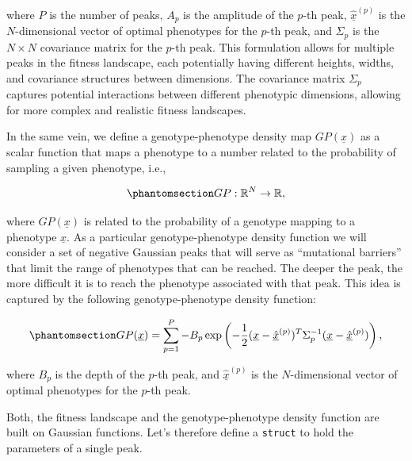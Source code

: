 \documentclass[
]{scrartcl}
\begin{document}
where \(P\) is the number of peaks, \(A_p\) is the amplitude of the
\(p\)-th peak, \(\underline{\hat{x}}^{(p)}\) is the \(N\)-dimensional
vector of optimal phenotypes for the \(p\)-th peak, and \(\Sigma_p\) is
the \(N \times N\) covariance matrix for the \(p\)-th peak. This
formulation allows for multiple peaks in the fitness landscape, each
potentially having different heights, widths, and covariance structures
between dimensions. The covariance matrix \(\Sigma_p\) captures
potential interactions between different phenotypic dimensions, allowing
for more complex and realistic fitness landscapes.

In the same vein, we define a genotype-phenotype density map
\(GP(\underline{x})\) as a scalar function that maps a phenotype to a
number related to the probability of sampling a given phenotype, i.e.,

\begin{equation}\phantomsection\label{eq-genotype-phenotype-density}{
GP: \mathbb{R}^N \to \mathbb{R},
}\end{equation}

where \(GP(\underline{x})\) is related to the probability of a genotype
mapping to a phenotype \(\underline{x}\). As a particular
genotype-phenotype density function we will consider a set of negative
Gaussian peaks that will serve as ``mutational barriers'' that limit the
range of phenotypes that can be reached. The deeper the peak, the more
difficult it is to reach the phenotype associated with that peak. This
idea is captured by the following genotype-phenotype density function:

\begin{equation}\phantomsection\label{eq-genotype-phenotype-density-gaussian}{
GP(\underline{x}) = 
\sum_{p=1}^P -B_p 
\exp\left(
    -\frac{1}{2}(\underline{x} - \underline{\hat{x}}^{(p)})^T 
    \Sigma_p^{-1} 
    (\underline{x} - \underline{\hat{x}}^{(p)})
\right),
}\end{equation}

where \(B_p\) is the depth of the \(p\)-th peak, and
\(\underline{\hat{x}}^{(p)}\) is the \(N\)-dimensional vector of optimal
phenotypes for the \(p\)-th peak.

Both, the fitness landscape and the genotype-phenotype density function
are built on Gaussian functions. Let's therefore define a
\texttt{struct} to hold the parameters of a single peak.
\end{document}
